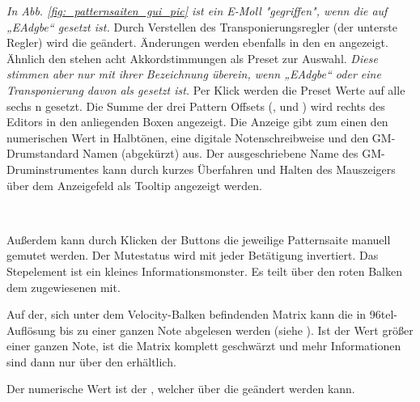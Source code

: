 \documentclass[10pt,final,a4paper]{report}
\begin{document}
\textit{In Abb. \ref{fig:_patternsaiten_gui_pic} ist ein E-Moll "gegriffen", wenn die  auf „EAdgbe“ gesetzt ist.}
%
%
%
Durch Verstellen des Transponierungsregler (der unterste Regler) wird die  geändert. Änderungen werden ebenfalls in den en angezeigt.
%
%
%
Ähnlich den  stehen acht Akkordstimmungen als Preset zur Auswahl. \textit{Diese stimmen aber nur mit ihrer Bezeichnung überein, wenn „EAdgbe“ oder eine Transponierung davon als  gesetzt ist.} Per Klick werden die Preset Werte auf alle sechs n gesetzt.
%
%
%
Die Summe der drei Pattern Offsets (,  und ) wird rechts des Editors in den anliegenden Boxen angezeigt. Die Anzeige gibt zum einen den numerischen Wert in Halbtönen, eine digitale Notenschreibweise und den GM-Drumstandard Namen (abgekürzt) aus. Der ausgeschriebene Name des GM-Druminstrumentes kann durch kurzes Überfahren und Halten des Mauszeigers über dem Anzeigefeld als Tooltip angezeigt werden.

~

Außerdem kann durch Klicken der Buttons die jeweilige Patternsaite manuell gemutet werden. Der Mutestatus wird mit jeder Betätigung invertiert.
%
%
%
Das Stepelement ist ein kleines Informationsmonster. Es teilt über den roten Balken dem  zugewiesenen  mit.

Auf der, sich unter dem Velocity-Balken befindenden Matrix kann die  in 96tel-Auflösung bis zu einer ganzen Note abgelesen werden (siehe ). Ist der Wert größer einer ganzen Note, ist die Matrix komplett geschwärzt und mehr Informationen sind dann nur über den  erhältlich. 

Der numerische Wert ist der , welcher über die  geändert werden kann.
\end{document}
